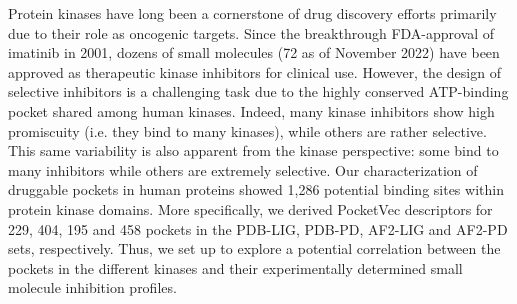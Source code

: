 Protein kinases have long been a cornerstone of drug discovery efforts primarily due to their role as oncogenic targets\cite{attwood_trends_2021}. Since the breakthrough FDA-approval of imatinib in 2001, dozens of small molecules (72 as of November 2022\cite{roskoski_properties_2023}) have been approved as therapeutic kinase inhibitors for clinical use. However, the design of selective inhibitors is a challenging task due to the highly conserved ATP-binding pocket shared among human kinases. Indeed, many kinase inhibitors show high promiscuity (i.e. they bind to many kinases), while others are rather selective\cite{karaman_quantitative_2008, davis_comprehensive_2011}. This same variability is also apparent from the kinase perspective: some bind to many inhibitors while others are extremely selective\cite{hanson_what_2019}. Our characterization of druggable pockets in human proteins showed 1,286 potential binding sites within protein kinase domains. More specifically, we derived PocketVec descriptors for 229, 404, 195 and 458 pockets in the PDB-LIG, PDB-PD, AF2-LIG and AF2-PD sets, respectively. Thus, we set up to explore a potential correlation between the pockets in the different kinases and their experimentally determined small molecule inhibition profiles.

